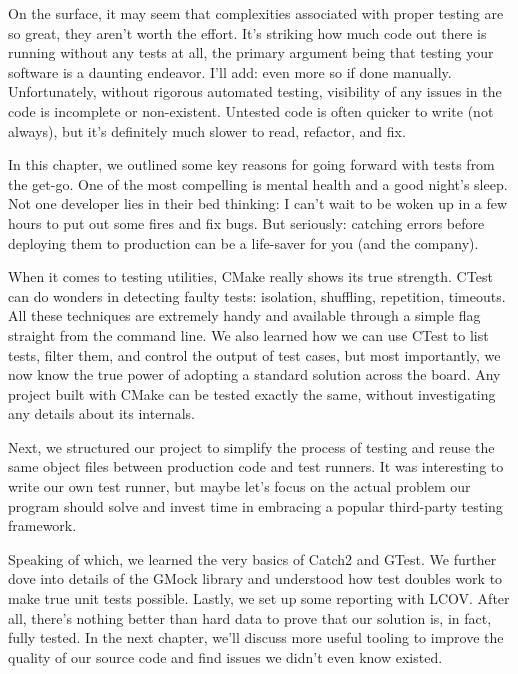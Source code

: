 

On the surface, it may seem that complexities associated with proper testing are so great, they aren't worth the effort. It's striking how much code out there is running without any tests at all, the primary argument being that testing your software is a daunting endeavor. I'll add: even more so if done manually. Unfortunately, without rigorous automated testing, visibility of any issues in the code is incomplete or non-existent. Untested code is often quicker to write (not always), but it's definitely much slower to read, refactor, and fix.

In this chapter, we outlined some key reasons for going forward with tests from the get-go. One of the most compelling is mental health and a good night's sleep. Not one developer lies in their bed thinking: I can't wait to be woken up in a few hours to put out some fires and fix bugs. But seriously: catching errors before deploying them to production can be a life-saver for you (and the company).

When it comes to testing utilities, CMake really shows its true strength. CTest can do wonders in detecting faulty tests: isolation, shuffling, repetition, timeouts. All these techniques are extremely handy and available through a simple flag straight from the command line. We also learned how we can use CTest to list tests, filter them, and control the output of test cases, but most importantly, we now know the true power of adopting a standard solution across the board. Any project built with CMake can be tested exactly the same, without investigating any details about its internals.

Next, we structured our project to simplify the process of testing and reuse the same object files between production code and test runners. It was interesting to write our own test runner, but maybe let's focus on the actual problem our program should solve and invest time in embracing a popular third-party testing framework.

Speaking of which, we learned the very basics of Catch2 and GTest. We further dove into details of the GMock library and understood how test doubles work to make true unit tests possible. Lastly, we set up some reporting with LCOV. After all, there's nothing better than hard data to prove that our solution is, in fact, fully tested.
In the next chapter, we'll discuss more useful tooling to improve the quality of our source code and find issues we didn't even know existed.








